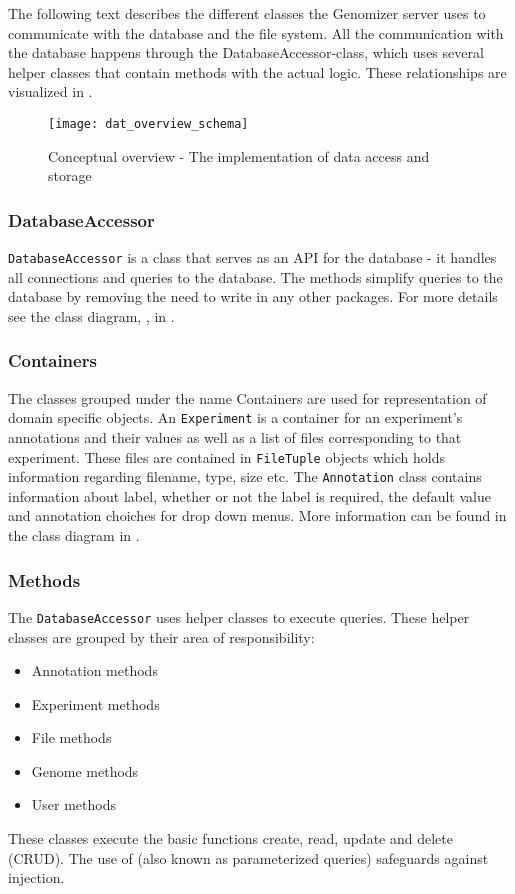 The following text describes the different classes the Genomizer server uses to communicate with the database and the file system. All the communication with the database happens through the DatabaseAccessor-class, which uses several helper classes that contain methods with the actual logic. These relationships are visualized in . 

\begin{figure}[h!]
	\centering
	\texttt{[image: dat\_overview\_schema]}
\caption{Conceptual overview - The implementation of data access and storage}
\label{fig:dat_overview_schema}
\end{figure}

\subsubsection{DatabaseAccessor}
\texttt{DatabaseAccessor} is a class that serves as an API for the  database - it handles all connections and queries to the database. The methods simplify queries to the database by removing the need to write  in any other packages. For more details see the class diagram, , in .

\subsubsection{Containers}
The classes grouped under the name Containers are used for representation of domain specific objects. An \texttt{Experiment} is a container for an experiment's annotations and their values as well as a list of files corresponding to that experiment. These files are contained in \texttt{FileTuple} objects which holds information regarding filename, type, size etc. The \texttt{Annotation} class contains information about label, whether or not the label is required, the default value and annotation choiches for drop down menus. More information can be found in the class diagram  in .

\subsubsection{Methods}
The \texttt{DatabaseAccessor} uses helper classes to execute  queries. These helper classes are grouped by their area of responsibility:
\begin{itemize}
\item Annotation methods
\item Experiment methods
\item File methods
\item Genome methods
\item User methods
\end{itemize}
These classes execute the basic  functions create, read, update and delete (CRUD). The use of  (also known as parameterized queries) safeguards against  injection.

